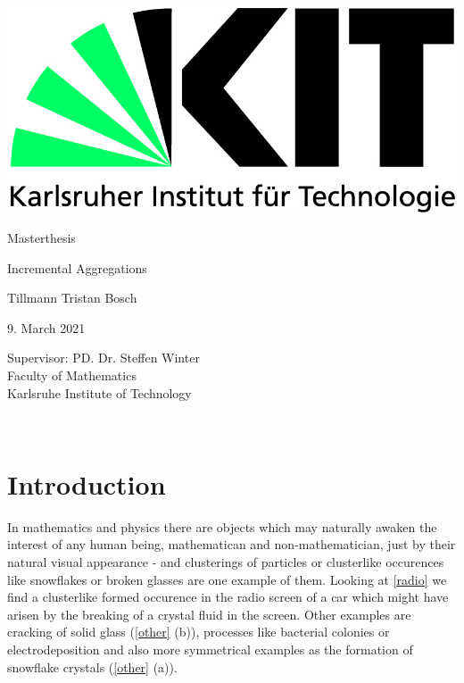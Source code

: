 \documentclass[12pt,a4paper]{scrartcl}
\newcommand{\1}{\mathbbm{1}}
\theoremstyle{definition}
\numberwithin{equation}{section}
\begin{document}
	\pagestyle{empty}

\begin{titlepage}

	\includegraphics[scale=0.45]{images/kit-logo.jpg} 
    \vspace*{2cm} 
\begin{center} \large 
    
   	Masterthesis
    \vspace*{2cm}

    {\huge Incremental Aggregations}\\
    \vspace*{2.5cm}

    Tillmann Tristan Bosch
    \vspace*{1.5cm}

    9. March 2021
    \vspace*{3.5cm}


    Supervisor: PD. Dr. Steffen Winter \\[1cm]
    Faculty of Mathematics\\[1cm]
	Karlsruhe Institute of Technology
\end{center}
\end{titlepage}

\newpage

\newpage
\phantom \\
\newpage

\tableofcontents %

 	\pagestyle{headings}

\setcounter{page}{1}


\newpage

\section{Introduction}
	In mathematics and physics there are objects which may naturally awaken the interest of any human being, mathematican and non-mathematician, just by their natural visual appearance - and clusterings of particles or clusterlike occurences like snowflakes or broken glasses are one example of them. Looking at \autoref{radio} we find a clusterlike formed occurence in the radio screen of a car which might have arisen by the breaking of a crystal fluid in the screen. Other examples are cracking of solid glass (\autoref{other} (b)), processes like bacterial colonies or electrodeposition and also more symmetrical examples as the formation of snowflake crystals (\autoref{other} (a)). \\
	
\end{document}
